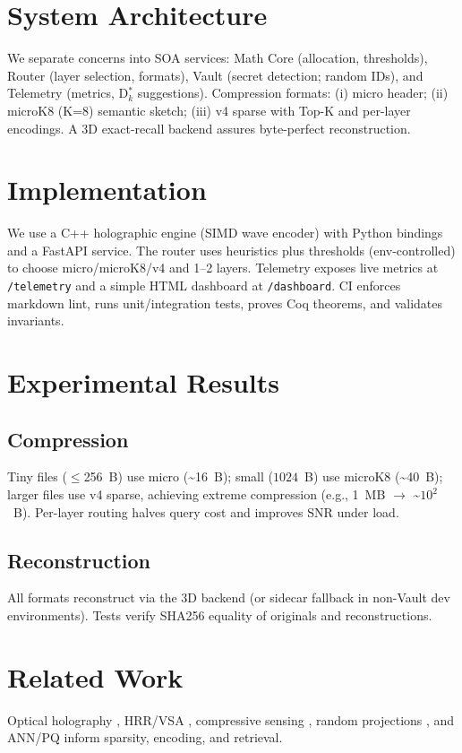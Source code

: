 \documentclass[conference]{IEEEtran}
\begin{document}
\section{System Architecture}
We separate concerns into SOA services: Math Core (allocation, thresholds), Router (layer selection, formats), Vault (secret detection; random IDs), and Telemetry (metrics, D$_k^*$ suggestions). Compression formats: (i) micro header; (ii) microK8 (K=8) semantic sketch; (iii) v4 sparse with Top-K and per-layer encodings. A 3D exact-recall backend assures byte-perfect reconstruction.

\section{Implementation}
We use a C++ holographic engine (SIMD wave encoder) with Python bindings and a FastAPI service. The router uses heuristics plus thresholds (env-controlled) to choose micro/microK8/v4 and 1--2 layers. Telemetry exposes live metrics at \texttt{/telemetry} and a simple HTML dashboard at \texttt{/dashboard}. CI enforces markdown lint, runs unit/integration tests, proves Coq theorems, and validates invariants.

\section{Experimental Results}
\subsection{Compression} Tiny files ($\le$256~B) use micro (\textasciitilde16~B); small (\le$1024$~B) use microK8 (\textasciitilde40~B); larger files use v4 sparse, achieving extreme compression (e.g., 1~MB $\rightarrow$ \textasciitilde$10^2$~B). Per-layer routing halves query cost and improves SNR under load.

\subsection{Reconstruction} All formats reconstruct via the 3D backend (or sidecar fallback in non-Vault dev environments). Tests verify SHA256 equality of originals and reconstructions.

\section{Related Work}
Optical holography \cite{gabor1948,goodman2017,born1999}, HRR/VSA \cite{plate1995,kanerva2009}, compressive sensing \cite{donoho2006,candes2008}, random projections \cite{johnson1984,achlioptas2003}, and ANN/PQ \cite{jegou2011} inform sparsity, encoding, and retrieval.
\end{document}
